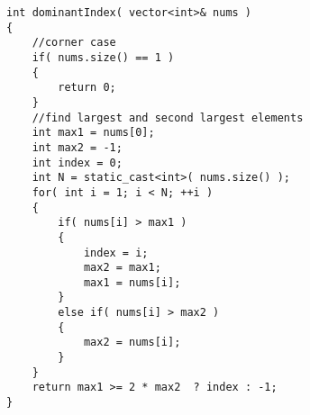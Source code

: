 \setcounter{lstlisting}{0}
\begin{lstlisting}[style=customc, caption={Scan}]
int dominantIndex( vector<int>& nums )
{
    //corner case
    if( nums.size() == 1 )
    {
        return 0;
    }
    //find largest and second largest elements
    int max1 = nums[0];
    int max2 = -1;
    int index = 0;
    int N = static_cast<int>( nums.size() );
    for( int i = 1; i < N; ++i )
    {
        if( nums[i] > max1 )
        {
            index = i;
            max2 = max1;
            max1 = nums[i];
        }
        else if( nums[i] > max2 )
        {
            max2 = nums[i];
        }
    }
    return max1 >= 2 * max2  ? index : -1;
}
\end{lstlisting}